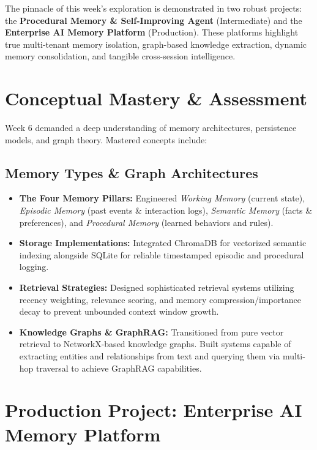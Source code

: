 \documentclass[12pt, a4paper]{article}
\begin{document}
The pinnacle of this week's exploration is demonstrated in two robust projects: the \textbf{Procedural Memory \& Self-Improving Agent} (Intermediate) and the \textbf{Enterprise AI Memory Platform} (Production). These platforms highlight true multi-tenant memory isolation, graph-based knowledge extraction, dynamic memory consolidation, and tangible cross-session intelligence.

\section{Conceptual Mastery \& Assessment}
Week 6 demanded a deep understanding of memory architectures, persistence models, and graph theory. Mastered concepts include:

\subsection{Memory Types \& Graph Architectures}
\begin{itemize}[label=\textcolor{secondary}{$\bullet$}]
    \item \textbf{The Four Memory Pillars:} Engineered \textit{Working Memory} (current state), \textit{Episodic Memory} (past events \& interaction logs), \textit{Semantic Memory} (facts \& preferences), and \textit{Procedural Memory} (learned behaviors and rules).
    \item \textbf{Storage Implementations:} Integrated ChromaDB for vectorized semantic indexing alongside SQLite for reliable timestamped episodic and procedural logging.
    \item \textbf{Retrieval Strategies:} Designed sophisticated retrieval systems utilizing recency weighting, relevance scoring, and memory compression/importance decay to prevent unbounded context window growth.
    \item \textbf{Knowledge Graphs \& GraphRAG:} Transitioned from pure vector retrieval to NetworkX-based knowledge graphs. Built systems capable of extracting entities and relationships from text and querying them via multi-hop traversal to achieve GraphRAG capabilities.
\end{itemize}

\newpage

\section{Production Project: Enterprise AI Memory Platform}
\end{document}
